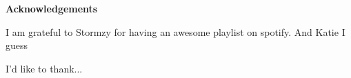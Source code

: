 \thispagestyle{empty}

\begin{center}
    {\LARGE\bf Acknowledgements}
\end{center}

I am grateful to Stormzy for having an awesome playlist on spotify. And Katie I guess

I'd like to thank...
